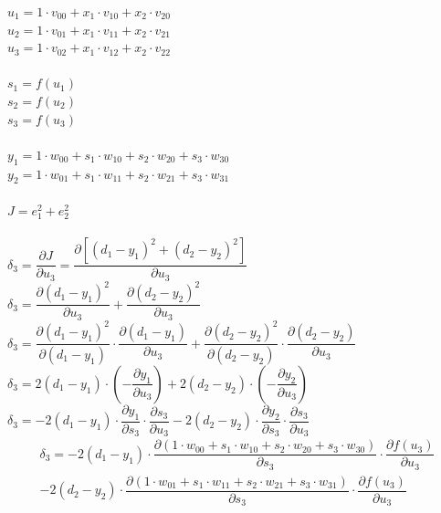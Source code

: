 \documentclass[a4paper]{article}    %
\begin{document}
$ u_1 = 1 \cdot v_{00} + x_1 \cdot v_{10} + x_2 \cdot v_{20} $\\
$ u_2 = 1 \cdot v_{01} + x_1 \cdot v_{11} + x_2 \cdot v_{21} $\\
$ u_3 = 1 \cdot v_{02} + x_1 \cdot v_{12} + x_2 \cdot v_{22} $\\
\vspace{0.1mm}\\
%
$ s_1 = f(u_1) $\\
$ s_2 = f(u_2) $\\
$ s_3 = f(u_3) $\\
\vspace{0.1mm}\\
%
$ y_1 = 1 \cdot w_{00} + s_1 \cdot w_{10} + s_2 \cdot w_{20} + s_3 \cdot w_{30} $\\
$ y_2 = 1 \cdot w_{01} + s_1 \cdot w_{11} + s_2 \cdot w_{21} + s_3 \cdot w_{31} $\\
\vspace{0.1mm}\\
%
$ J = e_1^2 + e_2^2 $\\
\vspace{0.1mm}\\
%
$ \delta_3 = \dfrac{\partial J}{\partial u_3} = \dfrac{\partial [(d_1-y_1)^2+(d_2-y_2)^2]}{\partial u_3} $\\
$ \delta_3 = \dfrac{\partial (d_1-y_1)^2}{\partial u_3} + \dfrac{\partial (d_2-y_2)^2}{\partial u_3} $\\
$ \delta_3 = \dfrac{\partial (d_1-y_1)^2}{\partial (d_1-y_1)} \cdot \dfrac{\partial (d_1-y_1)}{\partial u_3} + \dfrac{\partial (d_2-y_2)^2}{\partial (d_2-y_2)} \cdot \dfrac{\partial (d_2-y_2)}{\partial u_3} $\\
$ \delta_3 = 2(d_1-y_1) \cdot \left(-\dfrac{\partial y_1}{\partial u_3}\right) + 2(d_2-y_2) \cdot \left(-\dfrac{\partial y_2}{\partial u_3}\right) $\\
$ \delta_3 = - 2(d_1-y_1) \cdot \dfrac{\partial y_1}{\partial s_3} \cdot \dfrac{\partial s_3}{\partial u_3} - 2(d_2-y_2) \cdot \dfrac{\partial y_2}{\partial s_3} \cdot \dfrac{\partial s_3}{\partial u_3} $
\begin{multline*}
    \delta_3 = - 2(d_1-y_1) \cdot \dfrac{\partial (1 \cdot w_{00} + s_1 \cdot w_{10} + s_2 \cdot w_{20} + s_3 \cdot w_{30})}{\partial s_3} \cdot \dfrac{\partial f(u_3)}{\partial u_3} \\
    - 2(d_2-y_2) \cdot \dfrac{\partial (1 \cdot w_{01} + s_1 \cdot w_{11} + s_2 \cdot w_{21} + s_3 \cdot w_{31})}{\partial s_3} \cdot \dfrac{\partial f(u_3)}{\partial u_3}
\end{multline*}
\end{document}
